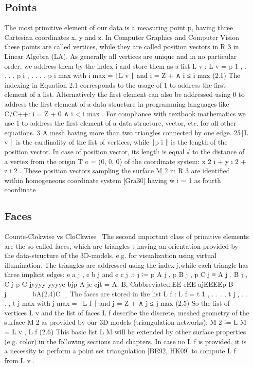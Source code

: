 \subsection{Points}
The most primitive element of our data is a measuring point p, having three 
Cartesian coordinates x, y and z. In Computer Graphics and Computer Vision these 
points are called vertices, while they are called position vectors in R 3 in 
Linear Algebra (LA). As generally all vertices are unique and in no particular 
order, we address them by the index i and store them as a list L v :
L v = { p 1 , . . . , p i , . . . , p i max } with i max = ∣L v ∣ and i = Z + ∧ 
i ≤ i max (2.1)
The indexing in Equation 2.1 corresponds to the usage of 1 to address the first 
element of a list. Alternatively the first element can also be addressed using 0 
to address the first element of a data structure in programming languages like 
C/C++: i = Z + 0 ∧ i < i max . For compliance with textbook mathematics we use 1 
to address the first element of a data structure, vector, etc. for all other 
equations. 3 A mesh having more than two triangles connected by one edge. 25∣L v 
∣ is the cardinality of the list of vertices, while ∣p i ∣ is the length of the 
position vector.
In case of position vector, its length is equal
√ to the distance of a vertex from the origin
T
o = (0, 0, 0) of the coordinate system: x 2 i + y i 2 + z i 2 . These position 
vectors sampling the surface M 2 in R 3 are identified within homogeneous 
coordinate system [Gra30] having
w i = 1 as fourth coordinate~\cite[p.~25-26]{Mara12}
%
\subsection{Faces}
Counte-Clokwise vs CloCkwise~\cite[p.~00]{todoCitation}\todoCitation
The second important class of primitive elements are the so-called faces, which 
are triangles t having an orientation provided by the data-structure of the 
3D-models, e.g. for visualization using virtual illumination. The triangles are 
addressed using the index j,while each triangle has three implicit edges: e a j 
, e b j and e c j .t j ∶= {p A j , p B j , p C j } ≡ {A j , B j , C j }p C jyyyy
yyyye bjp A je cjt = {A, B, C}abbreviated:EE eEE ajEEEEp B j~~~~~~ ~bA(2.4)C \_ 
The faces are stored in the list L f : L f = { t 1 , . . . , t j , . . . , t j 
max } with j max = ∣L f ∣ and j = Z + ∧ j ≤ j max
(2.5)
So the list of vertices L v and the list of faces L f describe the discrete, 
meshed geometry of the surface M 2 as provided by our 3D-models (triangulation 
networks): M 2 ∶= L M = {L v , L f } (2.6)
This basic list L M will be extended by other surface properties (e.g. color) in 
the following sections and chapters. In case no L f is provided, it is a 
necessity to perform a point set triangulation [BE92, HK09] to compute L f from 
L v .~\cite[p.~26]{Mara12}
%
